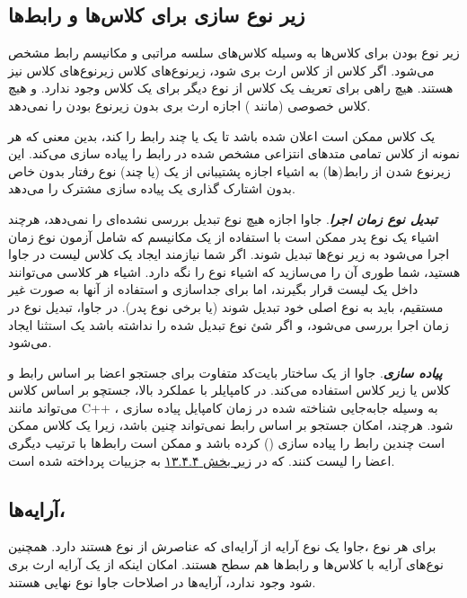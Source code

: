 \documentclass[a4paper,12pt]{report}
\newcommand{\lrm}[1]{{\color{steelBlue}\lr{\texttt{#1}}}}
\begin{document}
	\subsection{
	زیر نوع سازی برای کلاس‌ها و رابط‌ها}
	زیر نوع بودن برای کلاس‌ها به وسیله کلاس‌های سلسه مراتبی و مکانیسم رابط مشخص می‌شود.
	اگر کلاس
	\lrm{A}
	از کلاس 
	\lrm{B}
	ارث بری شود، زیر‌نوع‌های کلاس 
	\lrm{A}
	زیرنوع‌های کلاس
	\lrm{B}
	نیز هستند. هیچ راهی‌ برای تعریف یک کلاس از نوع دیگر برای یک کلاس وجود ندارد.
	و هیچ کلاس خصوصی (مانند 
	)
	اجازه ارث بری بدون زیرنوع بودن را نمی‌دهد. 
	
	یک کلاس ممکن است اعلان شده باشد تا یک یا چند رابط را 
	 \lrm{implement}
	کند، بدین معنی که هر نمونه از کلاس تمامی متد‌های انتزاعی مشخص شده در رابط را پیاده سازی می‌کند.
	این زیرنوع شدن از رابط‌(ها) به اشیاء اجازه پشتیبانی از یک (یا چند) نوع رفتار بدون خاص بدون اشتارک گذاری یک پیاده سازی مشترک را می‌دهد.
	
	
	\textbf{\textit{
	تبدیل نوع زمان اجرا}}. جاوا اجازه هیچ نوع تبدیل بررسی نشده‌ای را نمی‌دهد، هرچند اشیاء یک نوع پدر ممکن است با استفاده از یک مکانیسم که شامل آزمون نوع زمان اجرا می‌شود به زیر نوع‌ها  تبدیل شوند. اگر شما نیازمند ایجاد یک کلاس لیست در جاوا هستید، شما طوری آن را می‌سازید که اشیاء نوع  
	\lrm{Object}
	را نگه دارد. اشیاء هر کلاسی می‌توانند داخل یک لیست قرار بگیرند، اما برای جداسازی و استفاده از آنها به صورت غیر مستقیم، باید به نوع اصلی خود تبدیل شوند (یا برخی نوع پدر). 
	در جاوا، تبدیل نوع در زمان اجرا بررسی می‌شود، و اگر شئ نوع تبدیل شده را نداشته باشد یک استثنا ایجاد می‌شود.
	
	\textbf{\textit{
		پیاده سازی}}. جاوا از یک ساختار بایت‌کد متفاوت برای جستجو اعضا بر اساس رابط و کلاس یا زیر کلاس استفاده می‌کند. در کامپایلر با عملکرد بالا، جستچو بر اساس کلاس می‌تواند مانند 
	C++
	، به وسیله جابه‌جایی
	 شناخته شده در زمان کامپایل پیاده سازی شود. هرچند، امکان جستجو بر اساس رابط نمی‌تواند چنین باشد، زیرا یک کلاس ممکن است چندین رابط را پیاده سازی 
	()
	کرده باشد و ممکن است رابط‌ها با ترتیب دیگری اعضا را لیست کنند. که در 
	\hyperref[subsec4:sec4:chap13]{
	زیر بخش ۱۳.۴.۴} به جزییات پرداخته شده است.
	
	\subsection{
	آرایه‌ها، }
	برای هر نوع 
	\lrm{T}
	،جاوا یک نوع آرایه 
	\lrm{T[]}
	از آرایه‌ای که عناصرش از نوع 
	\lrm{T}
	هستند دارد. همچنین نوع‌های آرایه با کلاس‌ها و رابط‌ها هم سطح هستند. 
	امکان اینکه از یک آرایه ارث بری شود وجود ندارد، آرایه‌ها در اصلاحات جاوا نوع نهایی هستند.
	
\end{document}
